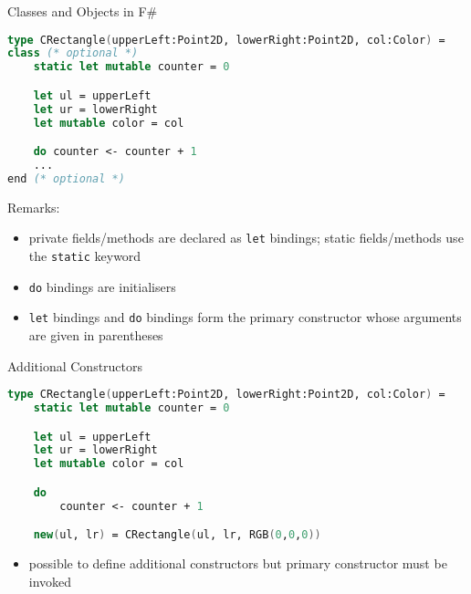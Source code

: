 \documentclass{beamer}
\begin{document}
\begin{frame}[fragile]{Classes and Objects in F\#}
\begin{lstlisting}[language=FSharp, basicstyle=\small, escapechar=\%]
type CRectangle(upperLeft:Point2D, lowerRight:Point2D, col:Color) =
class (* optional *)
    static let mutable counter = 0

    let ul = upperLeft
    let ur = lowerRight
    let mutable color = col

    do counter <- counter + 1
    ...
end (* optional *)
\end{lstlisting}%
Remarks:
\begin{overlayarea}{\textwidth}{0.3\textheight}
\begin{itemize}
  \item<+-> private fields/methods are declared as \lstinline{let}
    bindings; static fields/methods use the \lstinline!static! keyword
  \item<+-> \lstinline!do! bindings are initialisers
  \item<+-> \lstinline!let! bindings and \lstinline!do! bindings form the
    primary constructor whose arguments are given in parentheses
\end{itemize}
\end{overlayarea}
\end{frame}

\begin{frame}[fragile]{Additional Constructors}
\begin{lstlisting}[language=FSharp, escapechar=\%]
type CRectangle(upperLeft:Point2D, lowerRight:Point2D, col:Color) =
    static let mutable counter = 0

    let ul = upperLeft
    let ur = lowerRight
    let mutable color = col

    do
        counter <- counter + 1

    new(ul, lr) = CRectangle(ul, lr, RGB(0,0,0))     
\end{lstlisting}

\begin{overlayarea}{\textwidth}{0.3\textheight}
\begin{itemize}
 \item<+-> possible to define additional constructors but primary
   constructor must be invoked
\end{itemize}
\end{overlayarea}
\end{frame}
\end{document}
